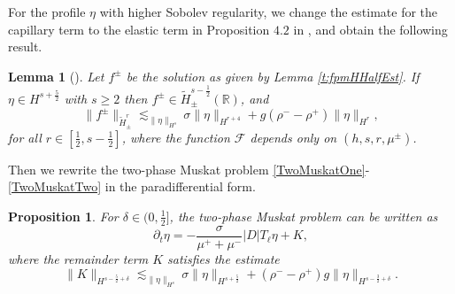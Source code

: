 \documentclass[12pt]{amsart}
\newtheorem{proposition}[theorem]{Proposition}
\newtheorem{lemma}[theorem]{Lemma}
\theoremstyle{definition}
\numberwithin{equation}{section}
\newcommand{\p}{\partial}
\newcommand{\R}{\mathbb{R}}
\newcommand{\f}{\frac}
\begin{document}
For the profile $\eta$ with higher Sobolev regularity, we change the estimate for the capillary term to the elastic term in Proposition $4.2$ in \cite{MR2812947}, and obtain the following result.
\begin{lemma} [\hspace{1sp}\cite{MR2812947}]
Let $f^\pm$ be the solution as given by Lemma \ref{t:fpmHHalfEst}.
If $\eta \in H^{s+\f52}$ with $s\geq 2$ then $f^\pm \in \tilde{H}^{s-\f12}_{\pm}(\R)$, and 
\begin{equation} \label{fpmEstR}
 \|f^\pm\|_{\tilde{H}^r_\pm} \lesssim_{\|\eta\|_{H^s}}  \sigma \|\eta\|_{H^{r+4}} + g(\rho^- - \rho^+)\|\eta\|_{H^r},
\end{equation}
for all $r\in [\f12, s-\f12]$, where the function $\mathcal{F}$ depends only on $(h,s,r, \mu^\pm)$.
\end{lemma}

Then we rewrite the two-phase Muskat problem \eqref{TwoMuskatOne}-\eqref{TwoMuskatTwo} in the paradifferential form.
\begin{proposition}
 For $\delta \in (0,\f12]$, the two-phase Muskat problem can be written as
 \begin{equation} \label{ParaTwoMuskat}
    \p_t \eta = -\frac{\sigma}{\mu^+ +\mu^{-}} |D|T_\ell \eta + K,
 \end{equation}
 where the remainder term $K$ satisfies the estimate
\begin{equation*}
    \|K\|_{H^{s-\f52+\delta}} \lesssim_{\|\eta\|_{H^s}} \sigma  \|\eta\|_{H^{s+\f52}} + (\rho^- - \rho^+)g\| \eta\|_{H^{s-\f32+\delta}}.
\end{equation*}
\end{proposition}
\end{document}
